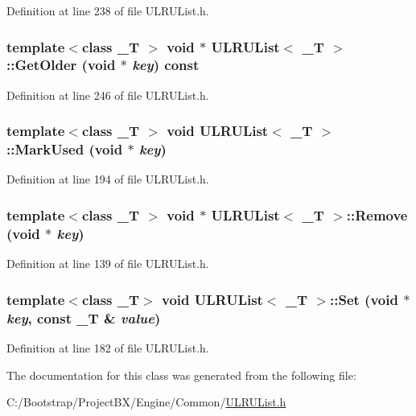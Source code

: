 Definition at line 238 of file ULRUList.h.\hypertarget{class_u_l_r_u_list_66a73df62b1d9ee5cc3b42c22d38374b}{
\subsubsection[{GetOlder}]{\setlength{\rightskip}{0pt plus 5cm}template$<$class \_\-T $>$ void $\ast$ {\bf ULRUList}$<$ \_\-T $>$::GetOlder (void $\ast$ {\em key}) const}}
\label{class_u_l_r_u_list_66a73df62b1d9ee5cc3b42c22d38374b}




Definition at line 246 of file ULRUList.h.\hypertarget{class_u_l_r_u_list_ded91108c238c0886b0610b491d09894}{
\subsubsection[{MarkUsed}]{\setlength{\rightskip}{0pt plus 5cm}template$<$class \_\-T $>$ void {\bf ULRUList}$<$ \_\-T $>$::MarkUsed (void $\ast$ {\em key})}}
\label{class_u_l_r_u_list_ded91108c238c0886b0610b491d09894}




Definition at line 194 of file ULRUList.h.\hypertarget{class_u_l_r_u_list_a907bd91d86f83c36cc75febf2a94c03}{
\subsubsection[{Remove}]{\setlength{\rightskip}{0pt plus 5cm}template$<$class \_\-T $>$ void $\ast$ {\bf ULRUList}$<$ \_\-T $>$::Remove (void $\ast$ {\em key})}}
\label{class_u_l_r_u_list_a907bd91d86f83c36cc75febf2a94c03}




Definition at line 139 of file ULRUList.h.\hypertarget{class_u_l_r_u_list_7b8b53b874e87051b88f0ea688c9ae4a}{
\subsubsection[{Set}]{\setlength{\rightskip}{0pt plus 5cm}template$<$class \_\-T$>$ void {\bf ULRUList}$<$ \_\-T $>$::Set (void $\ast$ {\em key}, \/  const \_\-T \& {\em value})}}
\label{class_u_l_r_u_list_7b8b53b874e87051b88f0ea688c9ae4a}




Definition at line 182 of file ULRUList.h.

The documentation for this class was generated from the following file:\begin{CompactItemize}
\item 
C:/Bootstrap/ProjectBX/Engine/Common/\hyperlink{_u_l_r_u_list_8h}{ULRUList.h}\end{CompactItemize}
